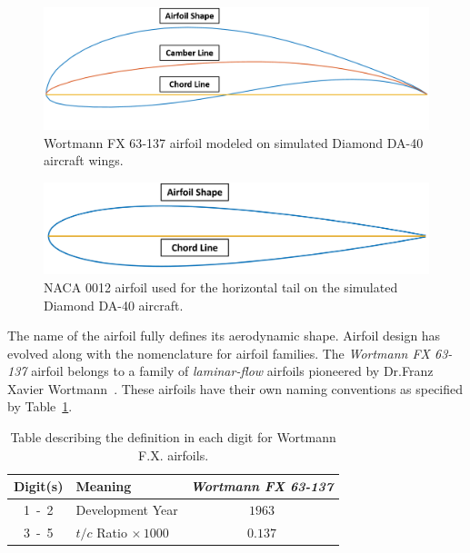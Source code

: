 \begin{figure}[!ht]\label{fig:airfoil}
    \centering
    \includegraphics[width=\linewidth]{Figures/da40airfoil.png}
    \caption{Wortmann FX 63{-}137 airfoil modeled on simulated Diamond DA-40 aircraft wings.}
\end{figure}

\begin{figure}[!ht]\label{fig:naca0012}
    \centering
    \includegraphics[width=\linewidth]{Figures/naca0012.png}
    \caption{NACA 0012 airfoil used for the horizontal tail on the simulated Diamond DA-40 aircraft.}
\end{figure}

The name of the airfoil fully defines its aerodynamic shape. Airfoil design has evolved along with the nomenclature for airfoil families. The \textit{Wortmann FX 63{-}137} airfoil belongs to a family of \textit{laminar-flow} airfoils pioneered by Dr.Franz Xavier Wortmann~\cite{raymerAircraftDesignConceptual2018}. These airfoils have their own naming conventions as specified by Table~\ref{tbl:wortmanndigits}.

\begin{table}[!ht]\label{tbl:wortmanndigits}
    \caption{Table describing the definition in each digit for Wortmann F.X. airfoils.}
    \centering
    \begin{tabular}{clc}
        \toprule
        \textbf{Digit{(s)}} & \textbf{Meaning}                 & \textbf{\textit{Wortmann FX 63{-}137}} \\
        \midrule
        1~-~2               & Development Year                 & \(1963\)                               \\
        3~-~5               & \(t/c\) Ratio \(\times \, 1000\) & \(0.137\)                              \\
        \bottomrule
    \end{tabular}
\end{table}

